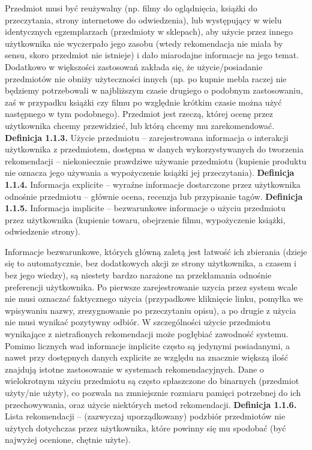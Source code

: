 \documentclass{pracamgr}
\begin{document}
    Przedmiot musi być reużywalny (np. filmy do oglądnięcia, książki do przeczytania, strony internetowe do odwiedzenia),
    lub występujący w wielu identycznych egzemplarzach (przedmioty w sklepach), aby użycie przez innego użytkownika nie wyczerpało jego zasobu
    (wtedy rekomendacja nie miała by sensu, skoro przedmiot nie istnieje) i dało miarodajne informacje na jego temat.
    Dodatkowo w większości zastosowań zakłada się, że użycie/posiadanie przedmiotów nie obniży użyteczności innych
    (np. po kupnie mebla raczej nie będziemy potrzebowali w najbliższym czasie drugiego o podobnym zastosowaniu,
    zaś w przypadku książki czy filmu po względnie krótkim czasie można użyć następnego w tym podobnego).
    Przedmiot jest rzeczą, której ocenę przez użytkownika chcemy przewidzieć, lub którą chcemy mu zarekomendować.\newline\newline
   \textbf{Definicja 1.1.3.} Użycie przedmiotu -- zarejestrowana informacja o interakcji użytkownika z przedmiotem,
   dostępna w danych wykorzystywanych do tworzenia rekomendacji -- niekoniecznie prawdziwe używanie przedmiotu
   (kupienie produktu nie oznacza jego używania a wypożyczenie książki jej przeczytania). \newline\newline
   \textbf{Definicja 1.1.4.} Informacja explicite -- wyraźne informacje dostarczone przez użytkownika odnośnie przedmiotu -- głównie
    ocena, recenzja lub przypisanie tagów.\newline\newline
   \textbf{Definicja 1.1.5.} Informacja implicite -- bezwarunkowe informacje o użyciu przedmiotu przez użytkownika
    (kupienie towaru, obejrzenie filmu, wypożyczenie książki, odwiedzenie strony).\newline
    
    Informacje bezwarunkowe, których główną zaletą jest łatwość ich zbierania
    (dzieje się to automatycznie, bez dodatkowych akcji ze strony użytkownika, a czasem i bez jego wiedzy),
    są niestety bardzo narażone na przekłamania odnośnie preferencji użytkownika.
    Po pierwsze zarejestrowanie uzycia przez system wcale nie musi oznaczać faktycznego użycia
    (przypadkowe kliknięcie linku, pomyłka we wpisywaniu nazwy, zrezygnowanie po przeczytaniu opisu), 
    a po drugie z użycia nie musi wynikać pozytywny odbiór.
    W szczególności użycie przedmiotu wynikające z nietrafionych rekomendacji może pogłębiać zawodność systemu.
    Pomimo licznych wad informacje implicite często są jedynymi posiadanymi, a nawet przy dostępnych danych explicite ze względu na
    znacznie większą ilość znajdują istotne zastosowanie w systemach rekomendacyjnych.
    Dane o wielokrotnym użyciu przedmiotu są często spłaszczone do binarnych (przedmiot użyty/nie użyty),
    co pozwala na zmniejsznie rozmiaru pamięci potrzebnej do ich przechowywania, oraz użycie niektórych metod rekomendacji.\newline\newline
   \textbf{Definicja 1.1.6.} Lista rekomendacji -- (zazwyczaj uporządkowany) podzbiór przedmiotów nie użytych dotychczas przez użytkownika,
    które powinny się mu spodobać (być najwyżej ocenione, chętnie użyte).
    
\end{document}
